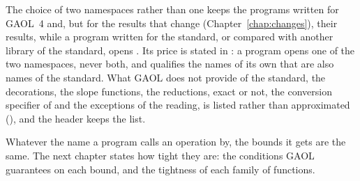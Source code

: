 \medskip
The choice of two namespaces rather than one keeps the programs written for
GAOL~4 and, but for the results that change (Chapter~\ref{chap:changes}),
their results, while a program written for the standard, or compared with
another library of the standard, opens . Its price is
stated in : a program opens one of the two
namespaces, never both, and qualifies the names of its own that are also names
of the standard. What GAOL does not provide of the standard, the decorations, the
slope functions, the reductions, exact or not, the conversion specifier of
 and the exceptions of the reading, is listed rather
than approximated (), and the header keeps the list.

\medskip
Whatever the name a program calls an operation by, the bounds it gets are
the same. The next chapter states how tight they are: the conditions GAOL
guarantees on each bound, and the tightness of each family of functions.
